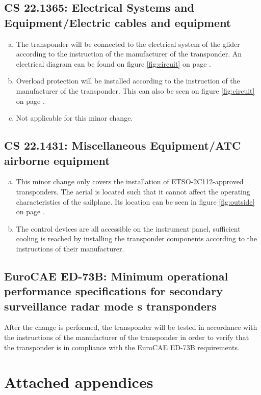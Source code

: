 \documentclass{article}
\begin{document}
\subsection[CS 22.1365]{CS 22.1365:  Electrical Systems and Equipment/Electric cables and equipment}
\begin{enumerate}[(a)]
\item The transponder will be connected to the electrical system of the glider according to the instruction of the manufacturer of the transponder. An electrical diagram can be found on figure \ref{fig:circuit} on page \pageref{fig:circuit}.
\item Overload protection will be installed according to the instruction of
the manufacturer of the transponder. This can also be seen on figure \ref{fig:circuit} on page \pageref{fig:circuit}.
\item Not applicable for this minor change.
\end{enumerate}

\subsection[CS 22.1431]{CS 22.1431:  Miscellaneous Equipment/ATC airborne equipment}
\begin{enumerate}[(a)]
\item This minor change only covers the installation of ETSO-2C112-approved transponders. The aerial is located such that it cannot affect the operating characteristics of the sailplane. Its location can be seen in figure \ref{fig:outside} on page \pageref{fig:outside}.
\item The control devices are all accessible on the instrument panel, sufficient cooling is reached by installing the transponder components according to the instructions of their manufacturer.
\end{enumerate}


\subsection[EuroCAE ED-73B]{EuroCAE ED-73B: Minimum operational performance specifications for secondary surveillance radar mode s transponders}
After the change is performed, the transponder will be tested in accordance with the instructions of the manufacturer of the transponder in order to verify that the transponder is in compliance with the EuroCAE ED-73B requirements.

\section{Attached appendices}
\listoffigures
\end{document}
